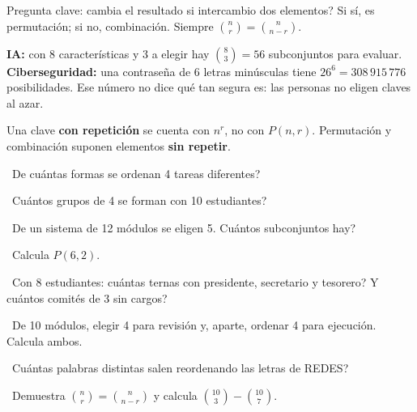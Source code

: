 \begin{tmtip}Pregunta clave: \textquestiondown cambia el resultado si intercambio dos elementos? Si s\'i, es permutaci\'on; si no, combinaci\'on. Siempre $\binom nr=\binom n{n-r}$.\end{tmtip}

\begin{tmsistemas}
\textbf{IA:} con 8 caracter\'isticas y 3 a elegir hay $\binom83=56$ subconjuntos para evaluar. \textbf{Ciberseguridad:} una contrase\~na de 6 letras min\'usculas tiene $26^6=308\,915\,776$ posibilidades. Ese n\'umero no dice qu\'e tan segura es: las personas no eligen claves al azar.
\end{tmsistemas}

\begin{tmcuidado}Una clave \textbf{con repetici\'on} se cuenta con $n^r$, no con $P(n, r)$. Permutaci\'on y combinaci\'on suponen elementos \textbf{sin repetir}.\end{tmcuidado}

\begin{tmejercicios}
\label{ej:2-2}
\begin{tmlista}
\item \tmbasico\ \textquestiondown De cu\'antas formas se ordenan 4 tareas diferentes?
\item \tmbasico\ \textquestiondown Cu\'antos grupos de 4 se forman con 10 estudiantes?
\item \tmbasico\ De un sistema de 12 m\'odulos se eligen 5. \textquestiondown Cu\'antos subconjuntos hay?
\item \tmmedio\ Calcula $P(6, 2)$.
\item \tmmedio\ Con 8 estudiantes: \textquestiondown cu\'antas ternas con presidente, secretario y tesorero? \textquestiondown Y cu\'antos comit\'es de 3 sin cargos?
\item \tmmedio\ De 10 m\'odulos, elegir 4 para revisi\'on y, aparte, ordenar 4 para ejecuci\'on. Calcula ambos.
\item \tmdificil\ \textquestiondown Cu\'antas palabras distintas salen reordenando las letras de REDES?
\item \tmdificil\ Demuestra $\binom nr=\binom n{n-r}$ y calcula $\binom{10}3-\binom{10}7$.
\end{tmlista}
\end{tmejercicios}


